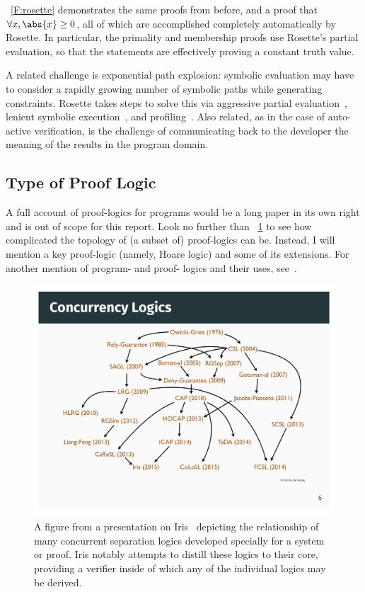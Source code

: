 \figurename~\ref{F:rosette} demonstrates the same proofs from before, and a
proof that \(\forall x, \abs{x} \ge 0\), all of which are accomplished
completely automatically by Rosette. In particular, the primality and membership
proofs use Rosette's partial evaluation, so that the statements are effectively
proving a constant truth value.

A related challenge is exponential path explosion: symbolic evaluation may have
to consider a rapidly growing number of symbolic paths while generating
constraints. Rosette takes steps to solve this via aggressive partial
evaluation~\cite{Torlak_2013,Torlak_2014}, lenient symbolic
execution~\cite{Chang_2018}, and
profiling~\cite{Bornholt_2018,Porncharoenwase_2020}. Also related, as in the
case of auto-active verification, is the challenge of communicating back to the
developer the meaning of the results in the program domain.

\subsection{Type of Proof Logic}\label{S:t_logic}

A full account of proof-logics for programs would be a long paper in its own
right and is out of scope for this report. Look no further than
\figurename~\ref{F:iris_complex} to see how complicated the topology of (a
subset of) proof-logics can be. Instead, I will mention a key proof-logic
(namely, Hoare logic) and some of its extensions. For another mention of
program- and proof- logics and their uses, see~\cite[\S 5]{Appel_2011}.

\begin{figure}
    \centering
    \includegraphics[width=\textwidth]{img/iris_2_0_concurrent_logics}
    \caption{A figure from a presentation on Iris~\cite{Jung_2016_slides}
    depicting the relationship of many concurrent separation logics developed
    specially for a system or proof. Iris notably attempts to distill these
    logics to their core, providing a verifier inside of which any of the
    individual logics may be derived.}\label{F:iris_complex}
\end{figure}

